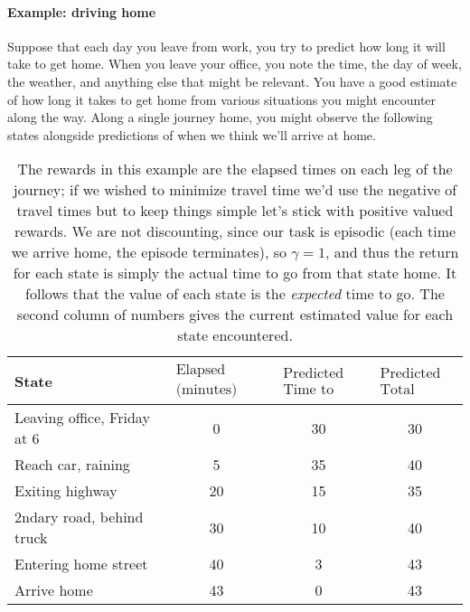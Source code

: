 \documentclass[12pt]{article}
\begin{document}
\paragraph{Example: driving home}
Suppose that each day you leave from work, you try to predict how long it will take to get home. When you leave your office, you note the time, the day of week, the weather, and anything else that might be relevant. You have a good estimate of how long it takes to get home from various situations you might encounter along the way. Along a single journey home, you might observe the following states alongside predictions of when we think we'll arrive at home.

\begin{table}[h]
  \centering
  \begin{tabular}{l c c c}
    State & $\substack{\textrm{Elapsed Time} \\ \textrm{(minutes)}}$ &                                                                        $\substack{\textrm{Predicted} \\ \textrm{Time to Go}}$ &
                                                                                                                                                                                         $\substack{\textrm{Predicted} \\ \textrm{Total Time}}$ \\
    \hline
    Leaving office, Friday at 6 & 0 & 30 & 30 \\
    Reach car, raining & 5 & 35 & 40 \\
    Exiting highway & 20 & 15 & 35 \\
    2ndary road, behind truck & 30 & 10 & 40 \\
    Entering home street & 40 & 3 & 43 \\
    Arrive home & 43 & 0 & 43
  \end{tabular}
  \caption{\footnotesize The rewards in this example are the elapsed times on each leg of the journey; if we wished to minimize travel time we'd use the negative of travel times but to keep things simple let's stick with positive valued rewards. We are not discounting, since our task is episodic (each time we arrive home, the episode terminates), so $\gamma = 1$, and thus the return for each state is simply the actual time to go from that state home. It follows that the value of each state is the \emph{expected} time to go. The second column of numbers gives the current estimated value for each state encountered.}
\end{table}
\end{document}
